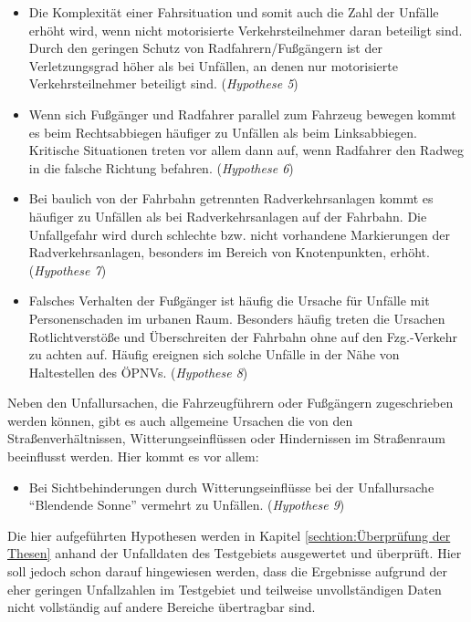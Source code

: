 \begin{itemize}
	\item Die Komplexität einer Fahrsituation und somit auch die Zahl der Unfälle erhöht wird, wenn nicht motorisierte Verkehrsteilnehmer daran beteiligt sind. Durch den geringen Schutz von Radfahrern/Fußgängern ist der Verletzungsgrad höher als bei Unfällen, an denen nur motorisierte Verkehrsteilnehmer beteiligt sind. (\textit{Hypothese 5})
	\item Wenn sich Fußgänger und Radfahrer parallel zum Fahrzeug bewegen kommt es beim Rechtsabbiegen häufiger zu Unfällen als beim Linksabbiegen. Kritische Situationen treten vor allem dann auf, wenn Radfahrer den Radweg in die falsche Richtung befahren. (\textit{Hypothese 6})
	\item Bei baulich von der Fahrbahn getrennten Radverkehrsanlagen kommt es häufiger zu Unfällen als bei Radverkehrsanlagen auf der Fahrbahn. Die Unfallgefahr wird durch schlechte bzw. nicht vorhandene Markierungen der Radverkehrsanlagen, besonders im Bereich von Knotenpunkten, erhöht. (\textit{Hypothese 7})
	\item Falsches Verhalten der Fußgänger ist häufig die Ursache für Unfälle mit Personenschaden im urbanen Raum. Besonders häufig treten die Ursachen Rotlichtverstöße und Überschreiten der Fahrbahn ohne auf den Fzg.-Verkehr zu achten auf. Häufig ereignen sich solche Unfälle in der Nähe von Haltestellen des ÖPNVs. (\textit{Hypothese 8})
\end{itemize}	

Neben den Unfallursachen, die Fahrzeugführern oder Fußgängern zugeschrieben werden können, gibt es auch allgemeine Ursachen die von den Straßenverhältnissen, Witterungseinflüssen oder Hindernissen im Straßenraum beeinflusst werden. Hier kommt es vor allem: 

\begin{itemize}	
	\item Bei Sichtbehinderungen durch Witterungseinflüsse bei der Unfallursache \enquote{Blendende Sonne} vermehrt zu Unfällen. (\textit{Hypothese 9})
\end{itemize}

Die hier aufgeführten Hypothesen werden in Kapitel \ref{sechtion:Überprüfung der Thesen} anhand der Unfalldaten des Testgebiets ausgewertet und überprüft. Hier soll jedoch schon darauf hingewiesen werden, dass die Ergebnisse aufgrund der eher geringen Unfallzahlen im Testgebiet und teilweise unvollständigen Daten nicht vollständig auf andere Bereiche übertragbar sind.



